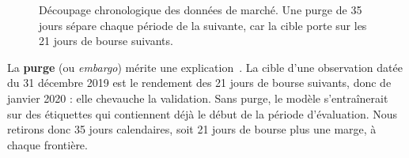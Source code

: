 \begin{figure}[H]
  \centering
  \caption{Découpage chronologique des données de marché. Une purge de 35 jours sépare chaque période de la suivante, car la cible porte sur les 21 jours de bourse suivants.}
  \label{fig:decoupage}
\end{figure}

La \textbf{purge} (ou \emph{embargo}) mérite une explication~\cite{lopezdeprado2018}. La cible d'une observation datée du 31 décembre 2019 est le rendement des 21 jours de bourse suivants, donc de janvier 2020 : elle chevauche la validation. Sans purge, le modèle s'entraînerait sur des étiquettes qui contiennent déjà le début de la période d'évaluation. Nous retirons donc 35 jours calendaires, soit 21 jours de bourse plus une marge, à chaque frontière.

